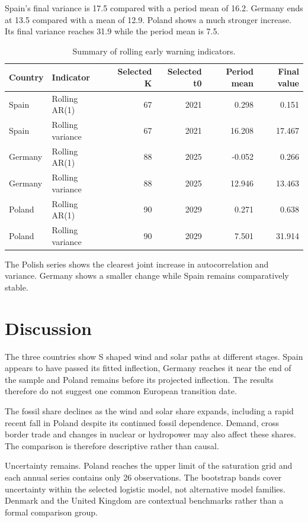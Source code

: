 \documentclass[
]{krantz}
\begin{document}
Spain's final variance is 17.5 compared with a period mean of 16.2. Germany ends at 13.5 compared with a mean of 12.9. Poland shows a much stronger increase. Its final variance reaches 31.9 while the period mean is 7.5.

\begin{table}

\caption{\label{tab:ptp-ewssummary}Summary of rolling early warning indicators.}
\centering
\begin{tabular}[t]{l|l|r|r|r|r}
\hline
Country & Indicator & Selected K & Selected t0 & Period mean & Final value\\
\hline
Spain & Rolling AR(1) & 67 & 2021 & 0.298 & 0.151\\
\hline
Spain & Rolling variance & 67 & 2021 & 16.208 & 17.467\\
\hline
Germany & Rolling AR(1) & 88 & 2025 & -0.052 & 0.266\\
\hline
Germany & Rolling variance & 88 & 2025 & 12.946 & 13.463\\
\hline
Poland & Rolling AR(1) & 90 & 2029 & 0.271 & 0.638\\
\hline
Poland & Rolling variance & 90 & 2029 & 7.501 & 31.914\\
\hline
\end{tabular}
\end{table}

The Polish series shows the clearest joint increase in autocorrelation and variance. Germany shows a smaller change while Spain remains comparatively stable.

\section*{Discussion}\label{discussion-4}


The three countries show S shaped wind and solar paths at different stages. Spain appears to have passed its fitted inflection, Germany reaches it near the end of the sample and Poland remains before its projected inflection. The results therefore do not suggest one common European transition date.

The fossil share declines as the wind and solar share expands, including a rapid recent fall in Poland despite its continued fossil dependence. Demand, cross border trade and changes in nuclear or hydropower may also affect these shares. The comparison is therefore descriptive rather than causal.

Uncertainty remains. Poland reaches the upper limit of the saturation grid and each annual series contains only 26 observations. The bootstrap bands cover uncertainty within the selected logistic model, not alternative model families. Denmark and the United Kingdom are contextual benchmarks rather than a formal comparison group.
\end{document}
